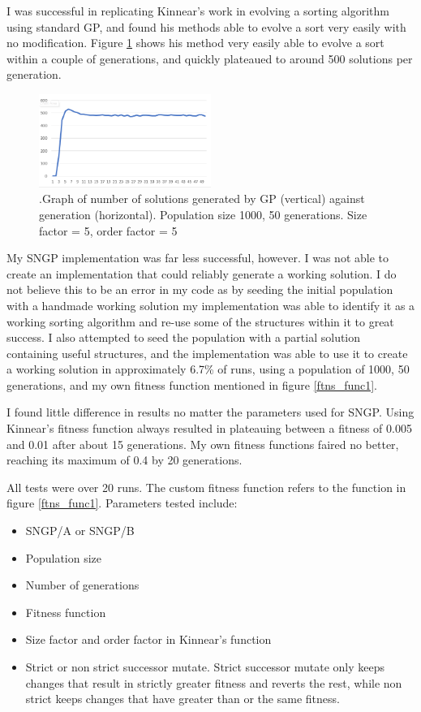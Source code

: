 \documentclass{article}
\begin{document}
        I was successful in replicating Kinnear's work in evolving a sorting algorithm using standard GP, and found his methods able to evolve a sort very easily with no modification. Figure \ref{g:gp_success} shows his method very easily able to evolve a sort within a couple of generations, and quickly plateaued to around 500 solutions per generation.
        
        \begin{figure}[h]
        	\centering
        	\includegraphics[width=0.5\textwidth]{g_gp_success}
        	\caption{.Graph of number of solutions generated by GP (vertical) against generation (horizontal). Population size 1000, 50 generations. Size factor = 5, order factor = 5}
        	\label{g:gp_success}
        \end{figure}
    
    	My SNGP implementation was far less successful, however. I was not able to create an implementation that could reliably generate a working solution. I do not believe this to be an error in my code as by seeding the initial population with a handmade working solution my implementation was able to identify it as a working sorting algorithm and re-use some of the structures within it to great success. I also attempted to seed the population with a partial solution containing useful structures, and the implementation was able to use it to create a working solution in approximately 6.7\% of runs, using a population of 1000, 50 generations, and my own fitness function mentioned in figure \ref{ftns_func1}.
    	
    	I found little difference in results no matter the parameters used for SNGP. Using Kinnear's fitness function always resulted in plateauing between a fitness of 0.005 and 0.01 after about 15 generations. My own fitness functions faired no better, reaching its maximum of 0.4 by 20 generations.
    	
    	All tests were over 20 runs. The custom fitness function refers to the function in figure \ref{ftns_func1}. Parameters tested include:
    	
    	\begin{itemize}
    		\item SNGP/A or SNGP/B
    		\item Population size
    		\item Number of generations
    		\item Fitness function
    		\item Size factor and order factor in Kinnear's function
    		\item Strict or non strict successor mutate. Strict successor mutate only keeps changes that result in strictly greater fitness and reverts the rest, while non strict keeps changes that have greater than or the same fitness.
    	\end{itemize}
    	
\end{document}
